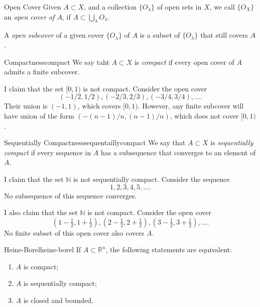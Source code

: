 
\begin{defn}{Open Cover}{}
	Given \(A \subset X\), and a collection \(\{O_\lambda\}\) of open sets in  \(X\), we call \(\{O_X\}\) an \emph{open cover of \(A\)}, if \(A \subset \bigcup_\lambda O_\lambda\).

	A \emph{open subcover} of a given cover \(\{O_\lambda\}\) of \(A\) is a subset of \(\{O_\lambda\}\) that still covers \(A\).
\end{defn}

\begin{defn}{Compactness}{compact}
	We say taht \(A \subset X\) is \emph{compact} if every open cover of \(A\) admits a finite subcover.
\end{defn}

\begin{exmp}{}{}
	I claim that the set \([0, 1)\) is not compact. Consider the open cover \[
		(-1/2, 1/2), (-2/3, 2/3), (-3/4, 3/4), \dots.
	\]
	Their union is \((-1, 1)\), which covers \([0, 1)\). However, any finite subcover will have union of the form \((-(n-1)/n, (n-1)/n)\), which does not cover \([0,1)\).
\end{exmp}

\begin{defn}{Sequentially Compactness}{sequentaillycompact}
	We say that \(A \subset X\) is \emph{sequentially compact} if every sequence in \(A\) has a subsequence that converges to an element of \(A\).
\end{defn}

\begin{exmp}{}{}
	I claim that the set \(\mathbb{N}\) is not sequentially compact. Consider the sequence \[
		1, 2, 3, 4, 5, \dots.
	\]
	No subsequence of this sequence converges.

	I also claim that the set \(\mathbb{N}\) is not compact. Consider the open cover \[
		(1 - \tfrac{1}{2}, 1+\tfrac{1}{2}), (2 - \tfrac{1}{2}, 2+\tfrac{1}{2}), (3-\tfrac{1}{2},3+\tfrac{1}{2}), \dots.
	\]
	No finite subset of this open cover also covers \(A\).
\end{exmp}

\begin{thm}{Heine-Borel}{heine-borel}
	If \(A \subset \mathbb{R}^n\), the following statements are equivalent:
	\begin{enumerate}
		\item \(A\) is compact;
		\item \(A\) is sequentially compact;
		\item \(A\) is closed and bounded.
	\end{enumerate}
\end{thm}
